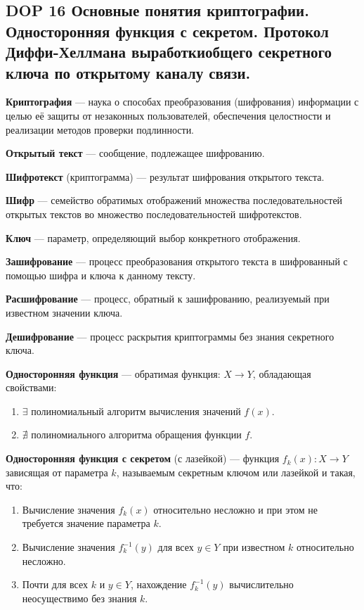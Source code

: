 \subsection*{DOP 16 Основные  понятия  криптографии.  Односторонняя  функция  с  секретом.  Протокол  Диффи-Хеллмана выработкиобщего секретного ключа по открытому каналу связи.}

\textbf{Криптография} --- наука о способах преобразования (шифрования) информации с целью её защиты от незаконных пользователей, обеспечения целостности и реализации методов проверки подлинности.

\textbf{Открытый текст} --- сообщение, подлежащее шифрованию.

\textbf{Шифротекст} (криптограмма) --- результат шифрования открытого текста.

\textbf{Шифр} --- семейство обратимых отображений множества последовательностей открытых текстов во множество последовательностей шифротекстов.

\textbf{Ключ} --- параметр, определяющий выбор конкретного отображения.

\textbf{Зашифрование} --- процесс преобразования открытого текста в шифрованный с помощью шифра и ключа к данному тексту.

\textbf{Расшифрование} --- процесс, обратный к зашифрованию, реализуемый при известном значении ключа.

\textbf{Дешифрование} --- процесс раскрытия криптограммы без знания секретного ключа.

\textbf{Односторонняя функция} --- обратимая функция: $X \rightarrow Y$, обладающая свойствами:
\begin{enumerate}
    \item $\exists$ полиномиальный алгоритм вычисления значений $f(x)$.
    \item $\nexists$ полиномиального алгоритма обращения функции $f$.
\end{enumerate}

\textbf{Односторонняя функция с секретом} (с лазейкой) — функция $f_k(x): X \rightarrow Y$ зависящая от параметра $k$, называемым секретным ключом или лазейкой и такая, что:
\begin{enumerate}
    \item Вычисление значения $f_k(x)$ относительно несложно и при этом не требуется значение параметра $k$.
    \item Вычисление значения $f^{-1}_k(y)$ для всех $y \in Y$ при известном $k$ относительно несложно.
    \item Почти для всех $k$ и $y \in Y$, нахождение $f^{-1}_k(y)$ вычислительно неосуществимо без знания $k$.
\end{enumerate}


